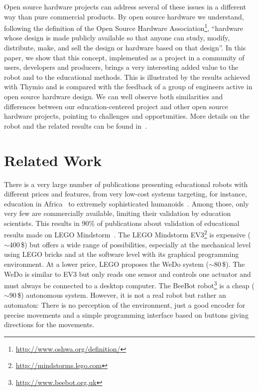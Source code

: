\documentclass[letterpaper, 10 pt, conference]{ieeeconf}  %
\begin{document}
Open source hardware projects can address several of these issues in a different way than pure commercial products. 
By open source hardware we understand, following the definition of the Open Source Hardware Association\footnote{\url{http://www.oshwa.org/definition/}}, ``hardware whose design is made publicly available so that anyone can study, modify, distribute, make, and sell the design or hardware based on that design''.
In this paper, we show that this concept, implemented as a project in a community of users, developers and producers, brings a very interesting added value to the robot and to the educational methods. 
This is illustrated by the results achieved with Thymio and is compared with the feedback of a group of engineers active in open source hardware design.
We can well observe both similarities and differences between our education-centered project and other open source hardware projects, pointing to challenges and opportunities.
More details on the robot and the related results can be found in~\cite{RiedoPhD, magnenat2014}.  

\section{Related Work}

There is a very large number of publications presenting educational robots with different prices and features, from very low-cost systems targeting, for instance, education in Africa~\cite{Rubenstein2015,Gyebi2015} to extremely sophisticated humanoids~\cite{Hood2015,Mazzoni2016}.
Among those, only very few are commercially available, limiting their validation by education scientists.
This results in 90\% of publications about validation of educational results made on LEGO Mindstorm~\cite{benitti2012exploring}.
The LEGO Mindstorm EV3\footnote{\url{http://mindstorms.lego.com}} is expensive ($\sim$400\,\$) but offers a wide range of possibilities, especially at the mechanical level using LEGO bricks and at the software level with its graphical programming environment. 
At a lower price, LEGO proposes the WeDo system ($\sim$80\,\$).
The WeDo is similar to EV3 but only reads one sensor and controls one actuator and must always be connected to a desktop computer.
The BeeBot robot\footnote{\url{http://www.beebot.org.uk}} is a cheap ($\sim$90\,\$) autonomous system.
However, it is not a real robot but rather an automaton: There is no perception of the environment, just a good encoder for precise movements and a simple programming interface based on buttons giving directions for the movements.
\end{document}
